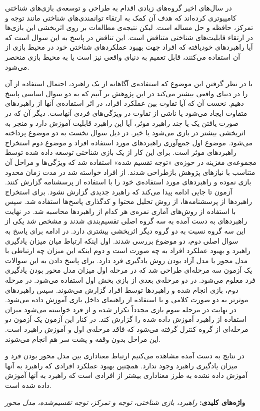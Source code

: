 \documentclass[twoside, a4paper,11pt]{book}
\numberwithin{equation}{chapter}
\numberwithin{table}{chapter}
\numberwithin{figure}{chapter}
\numberwithin{equation}{chapter}
\begin{document}
\vspace*{-.4cm}

\begin{spacing}{1.5}

در سال‌های اخیر گروه‌های زیادی اقدام به طراحی و توسعه‌ی بازی‌های شناختی کامپیوتری کرده‌اند که هدف آن کمک به ارتقاء توانمندی‌های شناختی مانند توجه و تمرکز، حافظه و حل مساله است. لیکن نتیجه‌ی مطالعات بر روی اثربخشی این بازی‌ها در ارتقاء قابلیت‌های شناختی متناقض است. این تناقض در پاسخ به این سوال است که آیا راهبردهای خودیافته که افراد جهت بهبود عملکردهای شناختی خود در محیط بازی از آن استفاده می‌کنند، قابل تعمیم به دنیای واقعی نیز است یا به محیط بازی منحصر می‌شود. 

با در نظر گرفتن این موضوع که استفاده‌ی آگاهانه از یک راهبرد، احتمال استفاده از آن را در دنیای واقعی بیشتر می‌کند در این پژوهش بر آنیم که به دو سوال اساسی پاسخ دهیم. نخست آن که  آیا تفاوت بین عملکرد افراد، در اثر استفاده‌ی آنها از راهبردهای متفاوت ایجاد می‌شود یا ناشی از تفاوت در ویژگی‌های فردی آنهاست. دیگر آن که در صورت یافتن یک یا چند راهبرد موثر، آیا این راهبرد قابلیت آموزش دارد و منجر به اثربخشی بیشتر در بازی می‌شود یا خیر. در ذیل سوال نخست به دو موضوع پرداخته می‌شود. موضوع اول جمع‌آوری راهبردهای مورد استفاده افراد و موضوع دوم استخراج راهبردهای موثر است. برای این کار از یک بازی شناختی توسعه داده شده توسط مجموعه‌ی مغزینه در حوزه‌ی «توجه تقسیم شده» استفاده شد که ویژگی‌ها و مراحل آن متناسب با نیازهای پژوهش بازطراحی شدند. از افراد خواسته شد در مدت زمان محدود بازی نموده و راهبردهای مورد استفاده‌ی خود را با استفاده از پرسشنامه گزارش کنند. آزمون تا جایی ادامه پیدا می‌کند که راهبرد جدیدی گزارش نشود. برای استخراج راهبردها از پرسشنامه‌ها، از روش تحلیل محتوا و کدگذاری پاسخ‌ها استفاده شد. سپس با استفاده از روش‌های آماری نمره‌ی هر کدام از راهبردها محاسبه شد. در نهایت راهبردهای به دست آمده به سه گروه اصلی تقسیم‌بندی شدند و مشخص شد یکی از این سه گروه نسبت به دو گروه دیگر اثربخشی بیشتری دارد. در ادامه برای پاسخ به سوال اصلی دوم، دو موضوع بررسی شدند. اول اینکه ارتباط میان میزان یادگیری راهبرد و بهبود عملکرد افراد به چه صورت است و دوم اینکه این میزان چه ارتباطی با مدل محور یا مدل آزاد بودن روش یادگیری فرد دارد. برای پاسخ دادن به این سوالات یک آزمون سه مرحله‌ای طراحی شد که در  مرحله اول میزان مدل محور بودن یادگیری فرد معلوم می‌شود. در دو مرحله‌ی بعدی از بازی بخش اول استفاده می‌شود. در  مرحله دوم، بازی انجام شده و راهبردها توسط افراد گزارش می‌شوند. سپس راهبردهای موثرتر به دو صورت کلامی و با استفاده از راهنمای داخل بازی آموزش داده می‌شود. در نهایت در مرحله سوم بازی مجدداً تکرار شده و از فرد خواسته می‌شود میزان استفاده از راهبرد آموزش داده شده را گزارش کند. در کنار این آزمون یک آزمون دو مرحله‌ای از گروه کنترل گرفته می‌شود که فاقد مرحله‌ی اول و آموزش راهبرد است. این مراحل بدون وقفه و پشت سر هم انجام می‌شوند. 

در نتایج به دست آمده مشاهده می‌کنیم ارتباط معناداری بین مدل محور بودن فرد و میزان یادگیری راهبرد وجود ندارد. همچنین بهبود عملکرد افرادی که راهبرد به آنها آموزش داده نشده به طرز معناداری بیشتر از افرادی است که راهبرد به آنها آموزش داده شده است.

\textbf{واژه‌های کلیدی: }\textit{راهبرد، بازی شناختی، توجه و تمرکز، توجه تقسیم‌شده، مدل محور}
\end{spacing}
\end{document}
